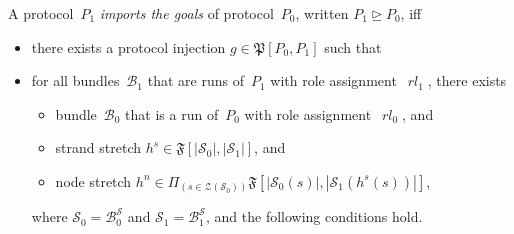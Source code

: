 \documentclass[12pt]{article}
\newcommand{\fn}[1]{\ensuremath{\operatorname{\mathit{#1}}}}
\newcommand{\dprod}[1]{\Pi_{(#1)}}
\newcommand{\alg}[1]{\ensuremath{\mathfrak{#1}}}
\newcommand{\ssp}{\ensuremath{\mathcal{S}}}
\newcommand{\bun}{\ensuremath{\mathcal{B}}}
\newcommand{\strands}{\ensuremath{\mathcal{Z}}}
\newcommand{\rl}{\fn{rl}}
\begin{document}
A protocol~$P_1$ \emph{imports the goals} of protocol~$P_0$, written
$P_1\unrhd P_0$, iff
\begin{itemize}
\item there exists a protocol injection $g\in\alg{P}[P_0,P_1]$ such
  that
\item for all bundles~$\bun_1$ that are runs of~$P_1$ with role
  assignment~$\rl_1$, there exists
  \begin{itemize}
  \item bundle~$\bun_0$ that is a run of~$P_0$ with role
    assignment~$\rl_0$, and
  \item strand stretch $h^s\in\alg{F}[|\ssp_0|, |\ssp_1|]$, and
  \item node stretch
    $h^n\in\dprod{s\in\strands(\ssp_0)}\alg{F}[|\ssp_0(s)|,
    |\ssp_1(h^s(s))|]$,
  \end{itemize}
  where $\ssp_0=\bun^\ssp_0$ and $\ssp_1=\bun^\ssp_1$, and the following
  conditions hold.
\end{itemize}
\end{document}
